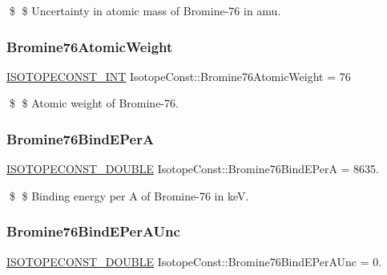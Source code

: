 \$ \$ Uncertainty in atomic mass of Bromine-\/76 in amu. \mbox{\label{group___isotope_const-_bromine-_br76_ga01e8d83dfddeec465311319ca81c91f7}} 
\subsubsection{\texorpdfstring{Bromine76\+Atomic\+Weight}{Bromine76AtomicWeight}}
{\footnotesize\ttfamily \mbox{\hyperlink{group___isotope_const-_macros_ga5f18360b3e99483a35c32d789e62621c}{I\+S\+O\+T\+O\+P\+E\+C\+O\+N\+S\+T\+\_\+\+I\+NT}} Isotope\+Const\+::\+Bromine76\+Atomic\+Weight = 76}

\$ \$ Atomic weight of Bromine-\/76. \mbox{\label{group___isotope_const-_bromine-_br76_ga3c004bd589aaca0f1499a01db9ce72da}} 
\subsubsection{\texorpdfstring{Bromine76\+Bind\+E\+PerA}{Bromine76BindEPerA}}
{\footnotesize\ttfamily \mbox{\hyperlink{group___isotope_const-_macros_ga8f45a7272ce02c0b4c65c44636ed719a}{I\+S\+O\+T\+O\+P\+E\+C\+O\+N\+S\+T\+\_\+\+D\+O\+U\+B\+LE}} Isotope\+Const\+::\+Bromine76\+Bind\+E\+PerA = 8635.}

\$ \$ Binding energy per A of Bromine-\/76 in keV. \mbox{\label{group___isotope_const-_bromine-_br76_ga3f2897c017bb5dcca80de27694320bed}} 
\subsubsection{\texorpdfstring{Bromine76\+Bind\+E\+Per\+A\+Unc}{Bromine76BindEPerAUnc}}
{\footnotesize\ttfamily \mbox{\hyperlink{group___isotope_const-_macros_ga8f45a7272ce02c0b4c65c44636ed719a}{I\+S\+O\+T\+O\+P\+E\+C\+O\+N\+S\+T\+\_\+\+D\+O\+U\+B\+LE}} Isotope\+Const\+::\+Bromine76\+Bind\+E\+Per\+A\+Unc = 0.}

